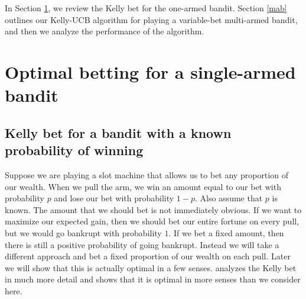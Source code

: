 \documentclass[letterpaper]{article}
\numberwithin{equation}{section}
\theoremstyle{plain}
\begin{document}
In Section \ref{singlearmed}, we review the Kelly bet for the one-armed bandit. Section \ref{mab} outlines our Kelly-UCB algorithm for playing a variable-bet multi-armed bandit, and then we analyze the performance of the algorithm.

\section{Optimal betting for a single-armed bandit}\label{singlearmed}
\subsection{Kelly bet for a bandit with a known probability of winning}
Suppose we are playing a slot machine that allows us to bet any proportion of our wealth. When we pull the arm, we win an amount equal to our bet with probability $p$ and lose our bet with probability $1-p$. Also assume that $p$ is known. The amount that we should bet is not immediately obvious. If we want to maximize our expected gain, then we should bet our entire fortune on every pull, but we would go bankrupt with probability $1$. If we bet a fixed amount, then there is still a positive probability of going bankrupt. Instead we will take a different approach and bet a fixed proportion of our wealth on each pull. Later we will show that this is actually optimal in a few senses. \cite{ethier2010doctrine} analyzes the Kelly bet in much more detail and shows that it is optimal in more senses than we consider here.
\end{document}
